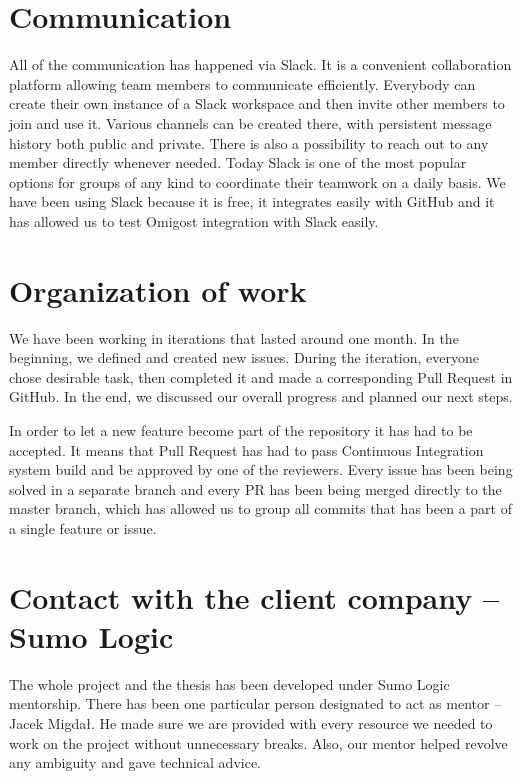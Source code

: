 \documentclass[licencjacka,en]{thesisclass}
\begin{document}
    \section{Communication}

    All of the communication has happened via Slack.
    It is a convenient collaboration platform allowing team members
    to communicate efficiently.
    Everybody can create their own instance of a Slack workspace and then
    invite other members to join and use it.
    Various channels can be created there,
    with persistent message history both public and private.
    There is also a possibility to reach out to any member directly whenever needed.
    Today Slack is one of the most popular options for groups of any kind to coordinate
    their teamwork on a daily basis.
    We have been using Slack because it is free, it integrates easily with GitHub
    and it has allowed us to test Omigost integration with Slack easily.

    \section{Organization of work}

    We have been working in iterations that lasted around one month.
    In the beginning, we defined and created new issues.
    During the iteration, everyone chose desirable task,
    then completed it and made a corresponding Pull Request in GitHub.
    In the end, we discussed our overall progress and planned our next steps.

    In order to let a new feature become part of the repository it has had to be accepted.
    It means that Pull Request has had to pass Continuous Integration
    system build and be approved by one of the reviewers.
    Every issue has been being solved in a separate branch and every PR
    has been being merged directly to the master branch, which has allowed us
    to group all commits that has been a part of a single feature or issue.

    \section{Contact with the client company -- Sumo Logic}

    The whole project and the thesis has been developed under Sumo Logic mentorship.
    There has been one particular person designated to act as mentor -- Jacek Migdał.
    He made sure we are provided with every resource we needed to
    work on the project without unnecessary breaks.
    Also, our mentor helped revolve any ambiguity and gave technical advice.
\end{document}
